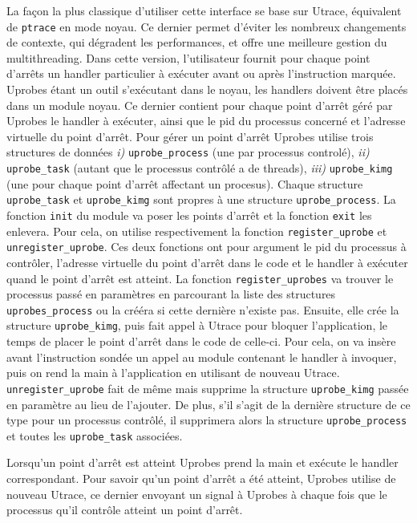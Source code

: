 La façon la plus classique d'utiliser cette interface se base sur Utrace,
équivalent de \texttt{ptrace} en mode noyau. Ce dernier permet d'éviter les
nombreux changements de contexte, qui dégradent les performances, et offre une
meilleure gestion du multithreading. Dans cette version, l'utilisateur fournit
pour chaque point d'arrêts un handler particulier à exécuter avant ou après
l’instruction marquée. Uprobes étant un outil s'exécutant dans le noyau, les
handlers doivent être placés dans un module noyau. Ce dernier contient pour
chaque point d'arrêt géré par Uprobes le handler à exécuter, ainsi que le pid du
processus concerné et l'adresse virtuelle du point d'arrêt. Pour gérer un point
d'arrêt Uprobes utilise trois structures de
données \textit{i)} \texttt{uprobe\_process} (une par processus controlé),
\textit{ii)} \texttt{uprobe\_task} (autant que le processus contrôlé a de
threads), \textit{iii)} \texttt{uprobe\_kimg} (une pour chaque point d'arrêt
affectant un procesus). Chaque structure \texttt{uprobe\_task} et
\texttt{uprobe\_kimg} sont propres à une structure \texttt{uprobe\_process}. La
fonction \texttt{init} du module va poser les points d'arrêt et la fonction
\texttt{exit} les enlevera. Pour cela, on utilise respectivement la fonction
\texttt{register\_uprobe} et \texttt{unregister\_uprobe}. Ces deux fonctions ont
pour argument le pid du processus à contrôler, l'adresse virtuelle du point
d'arrêt dans le code et le handler à exécuter quand le point d'arrêt est
atteint. La fonction \texttt{register\_uprobes} va trouver le processus passé en
paramètres en parcourant la liste des structures \texttt{uprobes\_process} ou la
crééra si cette dernière n'existe pas. Ensuite, elle crée la structure
\texttt{uprobe\_kimg}, puis fait appel à Utrace pour bloquer l'application, le
temps de placer le point d'arrêt dans le code de celle-ci. Pour cela, on va
insère avant l'instruction sondée un appel au module contenant le handler à
invoquer, puis on rend la main à l'application en utilisant de nouveau
Utrace. \texttt{unregister\_uprobe} fait de même mais supprime la structure
\texttt{uprobe\_kimg} passée en paramètre au lieu de l'ajouter. De plus, s'il
s'agit de la dernière structure de ce type pour un processus contrôlé, il
supprimera alors la structure \texttt{uprobe\_process} et toutes les
\texttt{uprobe\_task} associées.

Lorsqu'un point d'arrêt est atteint Uprobes prend la main et exécute le handler
correspondant. Pour savoir qu'un point d'arrêt a été atteint, Uprobes utilise de
nouveau Utrace, ce dernier envoyant un signal à Uprobes à chaque fois que le
processus qu'il contrôle atteint un point d'arrêt.

